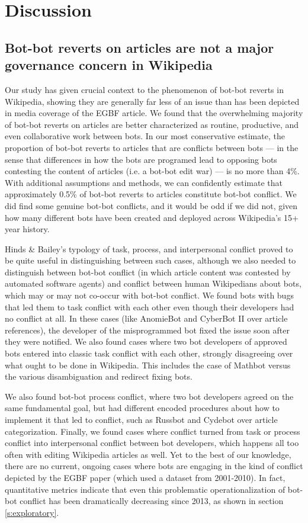 \documentclass[format=acmsmall, review=false, screen=true]{acmart}%
\begin{document}
\section{Discussion}

\subsection{Bot-bot reverts on articles are not a major governance concern in Wikipedia}  
Our study has given crucial context to the phenomenon of bot-bot reverts in Wikipedia, showing they are generally far less of an issue than has been depicted in media coverage of the EGBF article. We found that the overwhelming majority of bot-bot reverts on articles are better characterized as routine, productive, and even collaborative work between bots. In our most conservative estimate, the proportion of bot-bot reverts to articles that are conflicts between bots --- in the sense that differences in how the bots are programed lead to opposing bots contesting the content of articles (i.e. a bot-bot edit war) --- is no more than 4\%. With additional assumptions and methods, we can confidently estimate that approximately 0.5\% of bot-bot reverts to articles constitute bot-bot conflict. We did find some genuine bot-bot conflicts, and it would be odd if we did not, given how many different bots have been created and deployed across Wikipedia's 15+ year history. 

Hinds \& Bailey's typology of task, process, and interpersonal conflict \cite{Hinds2003} proved to be quite useful in distinguishing between such cases, although we also needed to distinguish between bot-bot conflict (in which article content was contested by automated software agents) and conflict between human Wikipedians about bots, which may or may not co-occur with bot-bot conflict. We found bots with bugs that led them to task conflict with each other even though their developers had no conflict at all. In these cases (like AnomieBot and CyberBot II over article references), the developer of the misprogrammed bot fixed the issue soon after they were notified. We also found cases where two bot developers of approved bots entered into classic task conflict with each other, strongly disagreeing over what ought to be done in Wikipedia. This includes the case of Mathbot versus the various disambiguation and redirect fixing bots.

We also found bot-bot process conflict, where two bot developers agreed on the same fundamental goal, but had different encoded procedures about how to implement it that led to conflict, such as Russbot and Cydebot over article categorization. Finally, we found cases where conflict turned from task or process conflict into interpersonal conflict between bot developers, which happens all too often with editing Wikipedia articles as well. Yet to the best of our knowledge, there are no current, ongoing cases where bots are engaging in the kind of conflict depicted by the EGBF paper (which used a dataset from 2001-2010). In fact, quantitative metrics indicate that even this problematic operationalization of bot-bot conflict has been dramatically decreasing since 2013, as shown in section \ref{s:exploratory}. 
\end{document}
